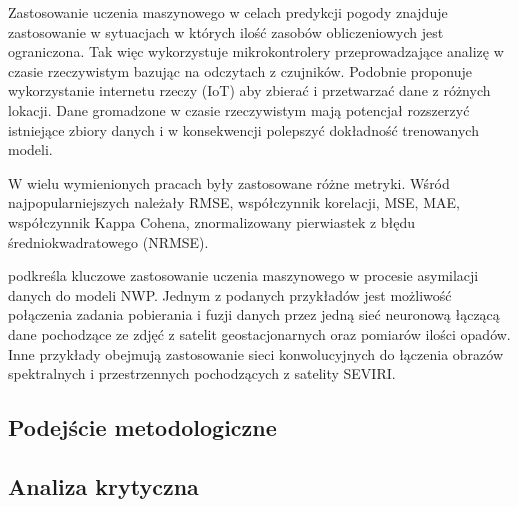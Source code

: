Zastosowanie uczenia maszynowego w celach predykcji pogody znajduje zastosowanie
w sytuacjach w których ilość zasobów obliczeniowych jest ograniczona. Tak więc
\cite{weather-forecasting-using-ml} wykorzystuje
mikrokontrolery przeprowadzające analizę w czasie rzeczywistym bazując na odczytach z 
czujników. Podobnie \cite{smart-weather-forecasting}
proponuje wykorzystanie internetu rzeczy (IoT) aby zbierać i przetwarzać dane z różnych lokacji.
Dane gromadzone w czasie rzeczywistym mają potencjał rozszerzyć istniejące zbiory danych
i w konsekwencji polepszyć dokładność trenowanych modeli.

W wielu wymienionych pracach \cite{development-and-application-of-ml-in}
były zastosowane różne metryki. Wśród najpopularniejszych
należały RMSE, współczynnik korelacji, MSE, MAE, współczynnik Kappa Cohena,
znormalizowany pierwiastek z błędu średniokwadratowego (NRMSE).

\cite{ai-revolutionises-weather-prediction}
podkreśla kluczowe zastosowanie uczenia maszynowego w procesie asymilacji danych do modeli NWP.
Jednym z podanych przykładów jest możliwość połączenia zadania pobierania i fuzji danych 
przez jedną sieć neuronową łączącą dane pochodzące ze zdjęć z satelit geostacjonarnych oraz 
pomiarów ilości opadów. Inne przykłady obejmują zastosowanie sieci konwolucyjnych do łączenia
obrazów spektralnych i przestrzennych pochodzących z satelity SEVIRI. 

\subsection{Podejście metodologiczne}

\subsection{Analiza krytyczna}

